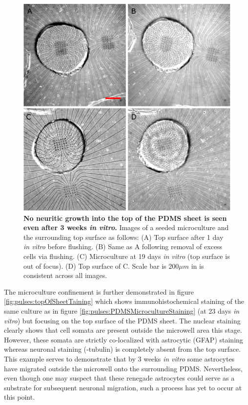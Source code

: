     \begin{figure}[!htb]
       \centering
       \includegraphics[width=15cm]{chapter6/figures/clearanceDemonstration/clearanceDemonstration.jpg}
       \caption[Effectiveness of surface-then-bond in maintaining an isolated microculture]{\textbf{No neuritic growth into the top of the PDMS sheet is seen even after 3 weeks \textit{in vitro}.} Images of a seeded microculture and the surrounding top surface as follows: (A) Top surface after 1 day \textit{in vitro} before flushing. (B) Same as A following removal of excess cells via flushing. (C) Microculture at 19 days \textit{in vitro} (top surface is out of focus). (D) Top surface of C. Scale bar is \(200 \mu m\) in is consistent across all images.}
       \label{fig:pulses:clearanceDemonstration}
   \end{figure}

   The microculture confinement is further demonstrated in figure \ref{fig:pulses:topOfSheetTaining} which shows immunohistochemical staining of the same culture as in figure \ref{fig:pulses:PDMSMicrocultureStaining} (at 23 days \textit{in vitro}) but focusing on the top surface of the PDMS sheet. The nuclear staining clearly shows that cell somata are present outside the microwell area this stage. However, these somata are strictly co-localized with astrocytic (GFAP) staining whereas neuronal staining (\textbeta -tubulin) is completely absent from the top surface. This example serves to demonstrate that by 3 weeks \textit{in vitro} some astrocytes have migrated outside the microwell onto the surrounding PDMS. Nevertheless, even though one may suspect that these renegade astrocytes could serve as a substrate for subsequent neuronal migration, such a process has yet to occur at this point.

